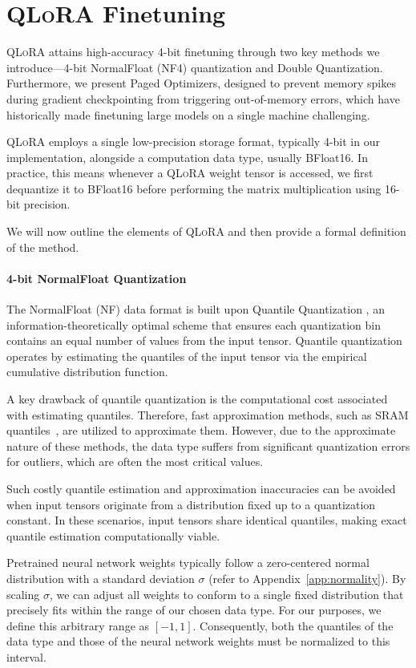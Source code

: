 \section{\textsc{QLoRA} Finetuning}

\textsc{QLoRA} attains high-accuracy 4-bit finetuning through two key methods we introduce—4-bit NormalFloat (NF4) quantization and Double Quantization. Furthermore, we present Paged Optimizers, designed to prevent memory spikes during gradient checkpointing from triggering out-of-memory errors, which have historically made finetuning large models on a single machine challenging.

\textsc{QLoRA} employs a single low-precision storage format, typically 4-bit in our implementation, alongside a computation data type, usually BFloat16. In practice, this means whenever a \textsc{QLoRA} weight tensor is accessed, we first dequantize it to BFloat16 before performing the matrix multiplication using 16-bit precision.

We will now outline the elements of \textsc{QLoRA} and then provide a formal definition of the method.

\paragraph{4-bit NormalFloat Quantization} The NormalFloat (NF) data format is built upon Quantile Quantization \citep{dettmers2022optimizers}, an information-theoretically optimal scheme that ensures each quantization bin contains an equal number of values from the input tensor. Quantile quantization operates by estimating the quantiles of the input tensor via the empirical cumulative distribution function.

A key drawback of quantile quantization is the computational cost associated with estimating quantiles. Therefore, fast approximation methods, such as SRAM quantiles~\citep{dettmers2022optimizers}, are utilized to approximate them. However, due to the approximate nature of these methods, the data type suffers from significant quantization errors for outliers, which are often the most critical values.

Such costly quantile estimation and approximation inaccuracies can be avoided when input tensors originate from a distribution fixed up to a quantization constant. In these scenarios, input tensors share identical quantiles, making exact quantile estimation computationally viable.

Pretrained neural network weights typically follow a zero-centered normal distribution with a standard deviation $\sigma$ (refer to Appendix~\ref{app:normality}). By scaling $\sigma$, we can adjust all weights to conform to a single fixed distribution that precisely fits within the range of our chosen data type. For our purposes, we define this arbitrary range as $[-1, 1]$. Consequently, both the quantiles of the data type and those of the neural network weights must be normalized to this interval.

